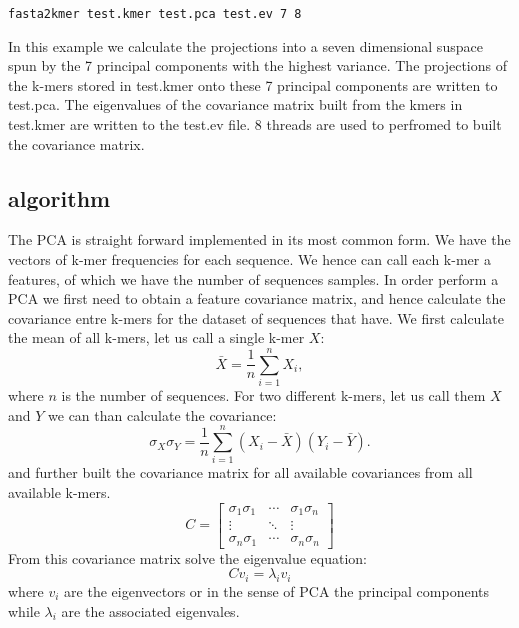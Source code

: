 \begin{lstlisting}
fasta2kmer test.kmer test.pca test.ev 7 8
\end{lstlisting}
In this example we calculate the projections into a seven dimensional
suspace spun by the 7 principal components with the highest
variance. The projections of the k-mers stored in test.kmer onto these
7 principal components are written to test.pca. The eigenvalues of the
covariance matrix built from the kmers in test.kmer are written to the
test.ev file. 8 threads are used to perfromed to built the covariance
matrix.

\subsection{algorithm}

The PCA is straight forward implemented in its most common form. We
have the vectors of k-mer frequencies for each sequence. We hence can
call each k-mer a features, of which we have the number of sequences
samples. In order perform a PCA we first need to obtain a feature
covariance matrix, and hence calculate the covariance entre k-mers for
the dataset of sequences that have. We first calculate the mean of all
k-mers, let us call a single k-mer $X$:
\begin{equation}
  \bar{X} = \frac{1}{n}\sum_{i=1}^{n}X_i,
\end{equation}
where $n$ is the number of sequences. For two different k-mers, let us
call them $X$ and $Y$ we can than calculate the covariance:
\begin{equation}
  \sigma_X\sigma_Y =
  \frac{1}{n}\sum_{i=1}^{n}(X_i-\bar{X})(Y_i-\bar{Y}). \label{eqn-covariance}
\end{equation}
and further built the covariance matrix for all available covariances
from all available k-mers.
\begin{equation}
  C = \left[
    \begin{array}{ccc}
      \sigma_1\sigma_1 & \cdots & \sigma_1\sigma_n \\
      \vdots & \ddots & \vdots \\
      \sigma_n\sigma_1 & \cdots & \sigma_n\sigma_n
    \end{array}
    \right] \label{eqn-covariance-matrix}
\end{equation}
From this covariance matrix solve the eigenvalue equation:
\begin{equation}
  Cv_i=\lambda_i v_i \label{eqn-eigen}
\end{equation}
where $v_i$ are the eigenvectors or in the sense of PCA the principal
components while $\lambda_i$ are the associated eigenvales.


